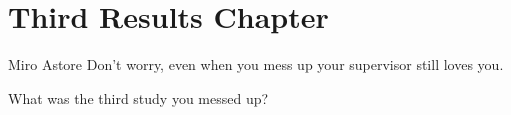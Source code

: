 \chapter{Third Results Chapter}
\label{chap:results_3}
\begin{chapquote}{Miro Astore}
	Don't worry, even when you mess up your supervisor still loves you.
\end{chapquote}

What was the third study you messed up?
